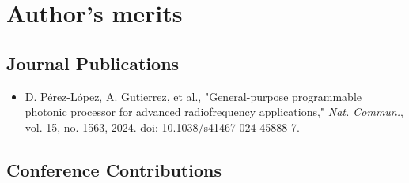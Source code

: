 
\chapter*{Author's merits} \label{sec:merits}

\section*{Journal Publications}

\begin{itemize}

  \item D. Pérez-López, A. Gutierrez, et al., "General-purpose programmable photonic processor for 
  advanced radiofrequency applications," \textit{Nat. Commun.}, vol. 15, no. 1563, 2024. doi: 
  \href{https://doi.org/10.1038/s41467-024-45888-7}{10.1038/s41467-024-45888-7}.
  
\end{itemize}

\section*{Conference Contributions}

